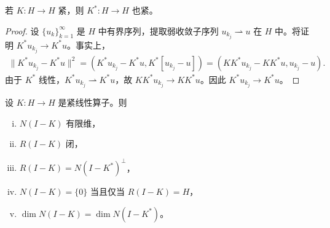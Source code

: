 \documentclass[../main.tex]{subfiles}
\begin{document}
\begin{theorem}[伴随的紧性。]\label{theorem:appD-伴随紧}若 $K:H\to H$ 紧，则 $K^*:H\to H$ 也紧。
\end{theorem}

\begin{proof}
设 $\{u_k\}_{k=1}^\infty$ 是 $H$ 中有界序列，提取弱收敛子序列 $u_{k_j}\rightharpoonup u$ 在 $H$ 中。将证明 $K^*u_{k_j}\to K^*u$。事实上，
\begin{align*}
\|K^*u_{k_j}-K^*u\|^2=(K^*u_{k_j}-K^*u,K^*[u_{k_j}-u])=(KK^*u_{k_j}-KK^*u,u_{k_j}-u).
\end{align*}
由于 $K^*$ 线性，$K^*u_{k_j}\rightharpoonup K^*u$，故 $KK^*u_{k_j}\to KK^*u$。因此 $K^*u_{k_j}\to K^*u$。
\end{proof}

\begin{theorem}\label{theorem:appD-Fredholm}设 $K:H\to H$ 是紧线性算子。则
\begin{enumerate}[(i)]
\item $N(I-K)$ 有限维，
\item $R(I-K)$ 闭，
\item $R(I-K)=N(I-K^*)^\perp$，
\item $N(I-K)=\{0\}$ 当且仅当 $R(I-K)=H$，
\item $\dim N(I-K)=\dim N(I-K^*)$。
\end{enumerate}
\end{theorem}
\end{document}
